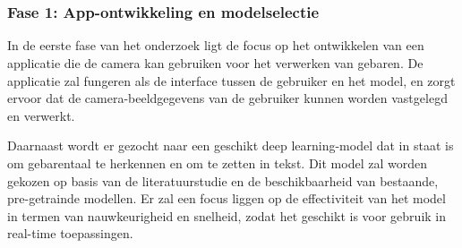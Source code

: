 
\chapter{}%
\label{ch:methodologie}


\subsection{Fase 1: App-ontwikkeling en modelselectie}
In de eerste fase van het onderzoek ligt de focus op het ontwikkelen van een applicatie die de camera kan gebruiken voor het verwerken van gebaren. De applicatie zal fungeren als de interface tussen de gebruiker en het model, en zorgt ervoor dat de camera-beeldgegevens van de gebruiker kunnen worden vastgelegd en verwerkt.

Daarnaast wordt er gezocht naar een geschikt deep learning-model dat in staat is om gebarentaal te herkennen en om te zetten in tekst. Dit model zal worden gekozen op basis van de literatuurstudie en de beschikbaarheid van bestaande, pre-getrainde modellen. Er zal een focus liggen op de effectiviteit van het model in termen van nauwkeurigheid en snelheid, zodat het geschikt is voor gebruik in real-time toepassingen.

